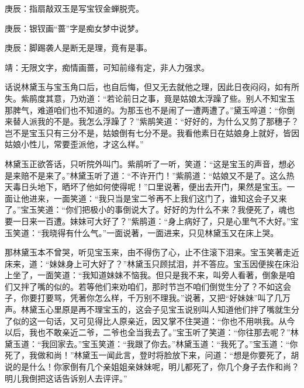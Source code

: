 \begin{parag}
    \begin{note}庚辰：指扇敲双玉是写宝钗金蝉脱壳。\end{note}
\end{parag}


\begin{parag}
    \begin{note}庚辰：银钗画“蔷”字是痴女梦中说梦。\end{note}
\end{parag}


\begin{parag}
    \begin{note}庚辰：脚踢袭人是断无是理，竟有是事。\end{note}
\end{parag}


\begin{parag}
    \begin{note}靖：无限文字，痴情画蔷，可知前缘有定，非人力强求。\end{note}
\end{parag}


\begin{parag}
    话说林黛玉与宝玉角口后，也自后悔，但又无去就他之理，因此日夜闷闷，如有所失。紫鹃度其意，乃劝道：“若论前日之事，竟是姑娘太浮躁了些。别人不知宝玉那脾气，难道咱们也不知道的。为那玉也不是闹了一遭两遭了。”黛玉啐道：“你倒来替人派我的不是。我怎么浮躁了？”紫鹃笑道：“好好的，为什么又剪了那穗子？岂不是宝玉只有三分不是，姑娘倒有七分不是。我看他素日在姑娘身上就好，皆因姑娘小性儿，常要歪派他，才这么样。”
\end{parag}


\begin{parag}
    林黛玉正欲答话，只听院外叫门。紫鹃听了一听，笑道：“这是宝玉的声音，想必是来赔不是来了。”林黛玉听了道：“不许开门！”紫鹃道：“姑娘又不是了。这么热天毒日头地下，晒坏了他如何使得呢！”口里说著，便出去开门，果然是宝玉。一面让他进来，一面笑道：“我只当是宝二爷再不上我们这门了，谁知这会子又来了。”宝玉笑道：“你们把极小的事倒说大了。好好的为什么不来？我便死了，魂也要一日来一百遭。妹妹可大好了？”紫鹃道：“身上病好了，只是心里气不大好。”宝玉笑道：“我晓得有什么气。”一面说著，一面进来，只见林黛玉又在床上哭。
\end{parag}


\begin{parag}
    那林黛玉本不曾哭，听见宝玉来，由不得伤了心，止不住滚下泪来。宝玉笑著走近床来，道：“妹妹身上可大好了？”林黛玉只顾拭泪，并不答应。宝玉因便挨在床沿上坐了，一面笑道：“我知道妹妹不恼我。但只是我不来，叫旁人看著，倒象是咱们又拌了嘴的似的。若等他们来劝咱们，那时节岂不咱们倒觉生分了？不如这会子，你要打要骂，凭著你怎么样，千万别不理我。”说著，又把“好妹妹”叫了几万声。林黛玉心里原是再不理宝玉的，这会子见宝玉说别叫人知道他们拌了嘴就生分了似的这一句话，又可见得比人原亲近，因又掌不住哭道：“你也不用哄我。从今以后，我也不敢亲近二爷，二爷也全当我去了。”宝玉听了笑道：“你往那去呢？”林黛玉道：“我回家去。”宝玉笑道：“我跟了你去。”林黛玉道：“我死了。”宝玉道：“你死了，我做和尚！”林黛玉一闻此言，登时将脸放下来，问道：“想是你要死了，胡说的是什么！你家倒有几个亲姐姐亲妹妹呢，明儿都死了，你几个身子去作和尚？明儿我倒把这话告诉别人去评评。”
\end{parag}



